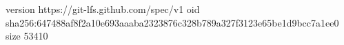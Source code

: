 version https://git-lfs.github.com/spec/v1
oid sha256:647488af8f2a10e693aaaba2323876c328b789a327f3123e65be1d9bcc7a1ee0
size 53410
